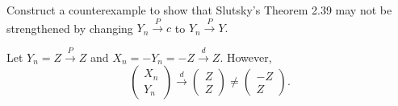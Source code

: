 \documentclass[12pt,]{article}
\begin{document}
Construct a counterexample to show that Slutsky's Theorem 2.39 may not
be strengthened by changing \(Y_n \overset{P}\rightarrow c\) to
\(Y_n\overset{P}\rightarrow Y.\)

Let \(Y_n = Z\overset{P}\rightarrow Z\) and
\(X_n = -Y_n = -Z \overset{d}\rightarrow Z\). However,
\[\begin{pmatrix} X_n \\ Y_n \end{pmatrix} \overset{d}\rightarrow \begin{pmatrix} Z \\ Z \end{pmatrix}\ne \begin{pmatrix} -Z \\ Z \end{pmatrix}.\]
\end{document}
